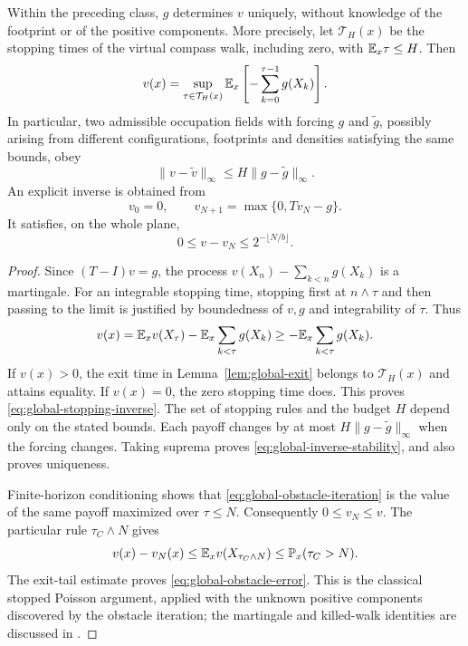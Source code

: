 \begin{theorem}
\label{thm:global-occupation}
Within the preceding class, $g$ determines $v$ uniquely, without
knowledge of the footprint or of the positive components. More
precisely, let $\mathcal T_H(x)$ be the stopping times of the virtual
compass walk, including zero, with $\mathbb E_x\tau\le H$. Then
\begin{equation}\label{eq:global-stopping-inverse}
 v(x)=\sup_{\tau\in\mathcal T_H(x)}
            \mathbb E_x\left[-\sum_{k=0}^{\tau-1}g(X_k)\right].
\end{equation}
In particular, two admissible occupation fields with forcing $g$ and
$\widetilde g$, possibly arising from different configurations,
footprints and densities satisfying the same bounds, obey
\begin{equation}\label{eq:global-inverse-stability}
                  \|v-\widetilde v\|_\infty
                         \le H\|g-\widetilde g\|_\infty.
\end{equation}
An explicit inverse is obtained from
\begin{equation}\label{eq:global-obstacle-iteration}
 v_0=0,\qquad v_{N+1}=\max\{0,Tv_N-g\}.
\end{equation}
It satisfies, on the whole plane,
\begin{equation}\label{eq:global-obstacle-error}
             0\le v-v_N\le2^{-\lfloor N/b\rfloor}.
\end{equation}
\end{theorem}
\begin{proof}
Since $(T-I)v=g$, the process
$v(X_n)-\sum_{k<n}g(X_k)$ is a martingale. For an integrable stopping
time, stopping first at $n\wedge\tau$ and then passing to the limit
is justified by boundedness of $v,g$ and integrability of $\tau$.
Thus
\[
 v(x)=\mathbb E_xv(X_\tau)
             -\mathbb E_x\sum_{k<\tau}g(X_k)
       \ge-\mathbb E_x\sum_{k<\tau}g(X_k).
\]
If $v(x)>0$, the exit time in Lemma~\ref{lem:global-exit} belongs to
$\mathcal T_H(x)$ and attains equality. If $v(x)=0$, the zero stopping
time does. This proves \eqref{eq:global-stopping-inverse}. The set of
stopping rules and the budget $H$ depend only on the stated bounds.
Each payoff changes by at most $H\|g-\widetilde g\|_\infty$ when
the forcing changes. Taking suprema proves
\eqref{eq:global-inverse-stability}, and also proves uniqueness.

Finite-horizon conditioning shows that \eqref{eq:global-obstacle-iteration}
is the value of the same payoff maximized over $\tau\le N$.
Consequently $0\le v_N\le v$. The particular rule
$\tau_C\wedge N$ gives
\[
 v(x)-v_N(x)\le\mathbb E_xv(X_{\tau_C\wedge N})
                     \le\mathbb P_x(\tau_C>N).
\]
The exit-tail estimate proves \eqref{eq:global-obstacle-error}.
This is the classical stopped Poisson argument, applied with the
unknown positive components discovered by the obstacle iteration;
the martingale and killed-walk identities are discussed in
\cite{LawlerLimic}.
\end{proof}


